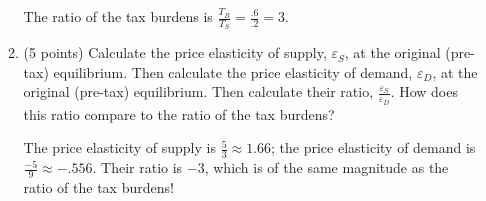 \documentclass{article}
\newcommand{\myitem}{\item (5 points)\ }
\begin{document}
\begin{enumerate}
\begin{enumerate}
\begin{KEY}
The ratio of the tax burdens is $\displaystyle \frac{T_B}{T_S} = \frac{.6}{.2}=3.$

\end{KEY}


    \item \begin{EXAM} (5 points) Calculate the price elasticity of supply, $\varepsilon_S$, at the original
(pre-tax) equilibrium. Then calculate the price elasticity of demand, $\varepsilon_D$, at the original (pre-tax) equilibrium. Then calculate their ratio, $\displaystyle \frac{\varepsilon_S}{\varepsilon_D}$. How does this ratio compare to the ratio of the tax burdens? \vspace{2.8in}  \end{EXAM}

\begin{KEY}

The price elasticity of supply is $\frac{5}{3}\approx 1.66$; the price elasticity of demand is $\frac{-5}{9}\approx -.556$. Their ratio is $-3$, which is of the same magnitude as the ratio of the tax burdens!


\end{KEY}







\end{enumerate}










\end{enumerate}
\end{document}
